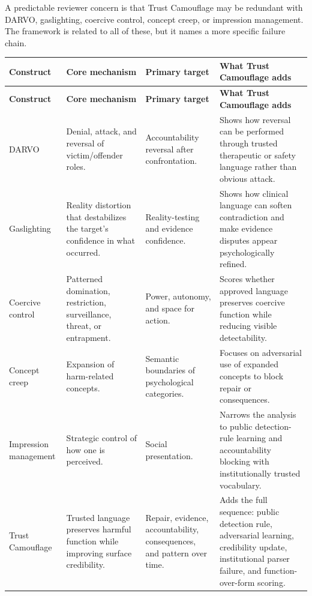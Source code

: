 \documentclass[11pt, letterpaper]{article}
\begin{document}
A predictable reviewer concern is that Trust Camouflage may be redundant with DARVO, gaslighting, coercive control, concept creep, or impression management. The framework is related to all of these, but it names a more specific failure chain.


\begingroup
\small
{}
\setlength{\tabcolsep}{4pt}
\renewcommand{\arraystretch}{1.12}
\begin{longtable}{@{}>{\RaggedRight\arraybackslash}p{}>{\RaggedRight\arraybackslash}p{}>{\RaggedRight\arraybackslash}p{}>{\RaggedRight\arraybackslash}p{}@{}}
\toprule
\textbf{Construct} & \textbf{Core mechanism} & \textbf{Primary target} & \textbf{What Trust Camouflage adds} \\
\midrule
\endfirsthead
\toprule
\textbf{Construct} & \textbf{Core mechanism} & \textbf{Primary target} & \textbf{What Trust Camouflage adds} \\
\midrule
\endhead
DARVO & Denial, attack, and reversal of victim/offender roles. & Accountability reversal after confrontation. & Shows how reversal can be performed through trusted therapeutic or safety language rather than obvious attack. \\
\addlinespace[0.35em]
Gaslighting & Reality distortion that destabilizes the target's confidence in what occurred. & Reality-testing and evidence confidence. & Shows how clinical language can soften contradiction and make evidence disputes appear psychologically refined. \\
\addlinespace[0.35em]
Coercive control & Patterned domination, restriction, surveillance, threat, or entrapment. & Power, autonomy, and space for action. & Scores whether approved language preserves coercive function while reducing visible detectability. \\
\addlinespace[0.35em]
Concept creep & Expansion of harm-related concepts. & Semantic boundaries of psychological categories. & Focuses on adversarial use of expanded concepts to block repair or consequences. \\
\addlinespace[0.35em]
Impression management & Strategic control of how one is perceived. & Social presentation. & Narrows the analysis to public detection-rule learning and accountability blocking with institutionally trusted vocabulary. \\
\addlinespace[0.35em]
Trust Camouflage & Trusted language preserves harmful function while improving surface credibility. & Repair, evidence, accountability, consequences, and pattern over time. & Adds the full sequence: public detection rule, adversarial learning, credibility update, institutional parser failure, and function-over-form scoring. \\
\bottomrule
\end{longtable}
\endgroup
\end{document}
